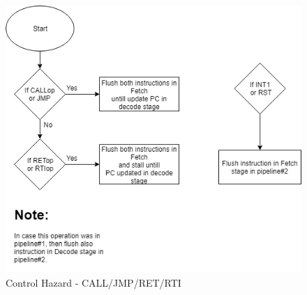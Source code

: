 \documentclass[12pt]{article}
\theoremstyle{plain}
\theoremstyle{definition}
\begin{document}
\begin{figure}
    \centering
    \includegraphics[width=\textwidth,keepaspectratio]{Diagrams/ControlHazard1.png}
    \caption{Control Hazard - CALL/JMP/RET/RTI}
    \label{control}
\end{figure}

			
\end{document}
